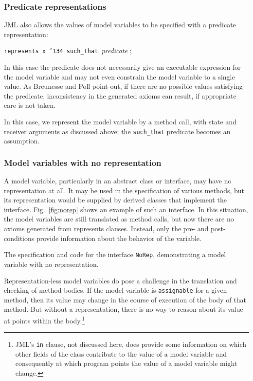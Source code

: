 \documentclass{sig-alternate}
\begin{document}
\subsubsection{Predicate representations}

JML also allows the values of model variables to be specified with a predicate representation:
\begin{center} \texttt{represents x \char'134 such\_that }{\em  predicate  } ; \end{center}
In this case the predicate does not necessarily give an executable expression for the
model variable and may not even constrain the model variable to a single value.  As
Breunesse and Poll point out, if there are no possible values satisfying the predicate, 
inconsistency in the generated axioms can result, if appropriate care is not taken.

In this case, we represent the model variable by a method call, with state and receiver arguments
as discussed above; the \texttt{such\_that} predicate becomes an assumption.

\subsubsection{Model variables with no representation}

A model variable, particularly in an abstract class or interface, may have no representation
at all.  It may be used in the specification of various methods, but its representation would be
supplied by derived classes that implement the interface.  Fig.~\ref{fig:norep}
shows an example of such an interface.  
In this situation, the model variables are still translated as method calls,
but now there are no axioms generated from represents clauses.  Instead, only the
pre- and post-conditions provide information about the behavior of the variable.

\begin{BFIGURE}

\caption{The specification and code for the interface \texttt{NoRep},
demonstrating a model variable with no representation.}
\label{fig:norep}
\end{BFIGURE}

Representation-less model variables do pose a challenge in the translation and checking of method bodies.  If the model variable is \texttt{assignable} for a given method, then its value may 
change in the course of execution of the body of that method.  But without a representation,
there is no way to reason about its value at points within the 
body.\footnote{JML's  \texttt{in} clause, not discussed here, does provide some information
on which other fields of the class contribute to the value of a model variable and consequently
at which program points the value of a model variable might change.}
\end{document}
